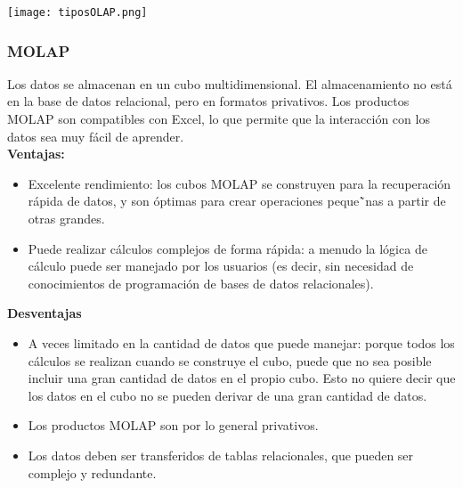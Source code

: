 \documentclass[DIV=calc, paper=a4, fontsize=11pt, twocolumn]{scrartcl}	 %
\begin{document}
\begin{center}
\texttt{[image: tiposOLAP.png]}
\end{center}

\subsubsection*{MOLAP}
Los datos se almacenan en un cubo multidimensional. El almacenamiento no est\'{a} en la base de datos relacional, pero en formatos privativos. Los productos MOLAP son compatibles con Excel, lo que permite que la interacci\'{o}n con los datos sea muy f\'{a}cil de aprender.\\
\textbf{Ventajas:}
\begin{itemize}
\item Excelente rendimiento: los cubos MOLAP se construyen para la recuperaci\'{o}n r\'{a}pida de datos, y son \'{o}ptimas para crear operaciones peque\~`{n}as a partir de otras grandes.
\item Puede realizar c\'{a}lculos complejos de forma r\'{a}pida: a menudo la l\'{o}gica de c\'{a}lculo puede ser manejado por los usuarios (es decir, sin necesidad de conocimientos de programaci\'{o}n de bases de datos relacionales).
\end{itemize}
\textbf{Desventajas}
\begin{itemize}
\item A veces limitado en la cantidad de datos que puede manejar: porque todos los c\'{a}lculos se realizan cuando se construye el cubo, puede que no sea posible incluir una gran cantidad de datos en el propio cubo. Esto no quiere decir que los datos en el cubo no se pueden derivar de una gran cantidad de datos.
\item Los productos MOLAP son por lo general privativos.
\item Los datos deben ser transferidos de tablas relacionales, que pueden ser complejo y redundante.
\end{itemize}
\end{document}
